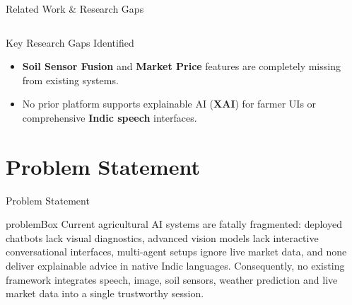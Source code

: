 \documentclass[aspectratio=169, 10pt]{beamer}
\begin{document}
\begin{frame}{Related Work \& Research Gaps}
{\begin{tabular}{llcccccccc}
            \bottomrule
        \end{tabular}
    }
    \vspace{0.15cm}
    \begin{block}{\footnotesize Key Research Gaps Identified}
        \footnotesize
        \begin{itemize}
            \item \textbf{Soil Sensor Fusion} and \textbf{Market Price} features are completely missing from existing systems.
            \item No prior platform supports explainable AI (\textbf{XAI}) for farmer UIs or comprehensive \textbf{Indic speech} interfaces.
        \end{itemize}
    \end{block}
\end{frame}

\section{Problem Statement}
\begin{frame}{Problem Statement}
    \vspace{0.8cm}
    \begin{beamercolorbox}[wd=\textwidth, rounded=true, shadow=true, sep=0.4cm]{problemBox}
        Current agricultural AI systems are fatally fragmented: deployed chatbots lack visual diagnostics, advanced vision models lack interactive conversational interfaces, multi-agent setups ignore live market data, and none deliver explainable advice in native Indic languages. Consequently, no existing framework integrates speech, image, soil sensors, weather prediction and live market data into a single trustworthy session.
    \end{beamercolorbox}
\end{frame}

\end{document}
